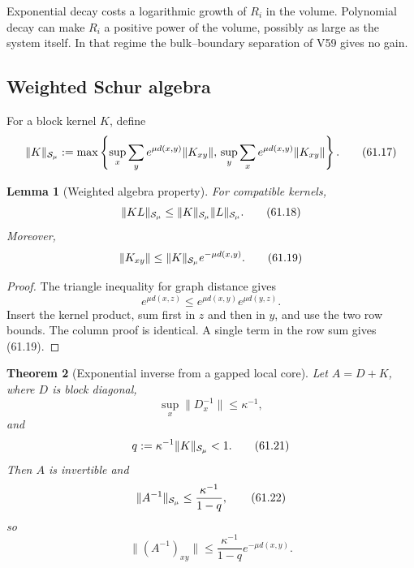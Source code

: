 \documentclass[11pt]{article}
\newtheorem{theorem}{Theorem}[section]
\newtheorem{lemma}[theorem]{Lemma}
\begin{document}
Exponential decay costs a logarithmic growth of \(R_i\) in the volume.
Polynomial decay can make \(R_i\) a positive power of the volume,
possibly as large as the system itself.  In that regime the
bulk--boundary separation of V59 gives no gain.

\subsection{Weighted Schur algebra}

For a block kernel \(K\), define
\[
 \lVert K\rVert_{{\cal S}_\mu}
 :=\max\left\{
 \sup_x\sum_y e^{\mu d(x,y)}\lVert K_{xy}\rVert,\,
 \sup_y\sum_x e^{\mu d(x,y)}\lVert K_{xy}\rVert
 \right\}.                                                    \tag{61.17}
\]

\begin{lemma}[Weighted algebra property]
\label{lem:v11v61-algebra}
For compatible kernels,
\[
                   \lVert KL\rVert_{{\cal S}_\mu}
             \le\lVert K\rVert_{{\cal S}_\mu}
                \lVert L\rVert_{{\cal S}_\mu}.                \tag{61.18}
\]
Moreover,
\[
                         \lVert K_{xy}\rVert
            \le\lVert K\rVert_{{\cal S}_\mu}e^{-\mu d(x,y)}. \tag{61.19}
\]
\end{lemma}

\begin{proof}
The triangle inequality for graph distance gives
\[
 e^{\mu d(x,z)}
 \le e^{\mu d(x,y)}e^{\mu d(y,z)}.
\]
Insert the kernel product, sum first in \(z\) and then in \(y\), and
use the two row bounds.  The column proof is identical.  A single term
in the row sum gives (61.19).
\end{proof}

\begin{theorem}[Exponential inverse from a gapped local core]
\label{thm:v11v61-inverse}
Let \(A=D+K\), where \(D\) is block diagonal,
\[
                         \sup_x\lVert D_x^{-1}\rVert\le\kappa^{-1},
                                                                  \tag{61.20}
\]
and
\[
                         q:=\kappa^{-1}
                             \lVert K\rVert_{{\cal S}_\mu}<1. \tag{61.21}
\]
Then \(A\) is invertible and
\[
 \lVert A^{-1}\rVert_{{\cal S}_\mu}
                    \le\frac{\kappa^{-1}}{1-q},               \tag{61.22}
\]
so
\[
                         \lVert(A^{-1})_{xy}\rVert
                    \le\frac{\kappa^{-1}}{1-q}
                                e^{-\mu d(x,y)}.               \tag{61.23}
\]
\end{theorem}
\end{document}

